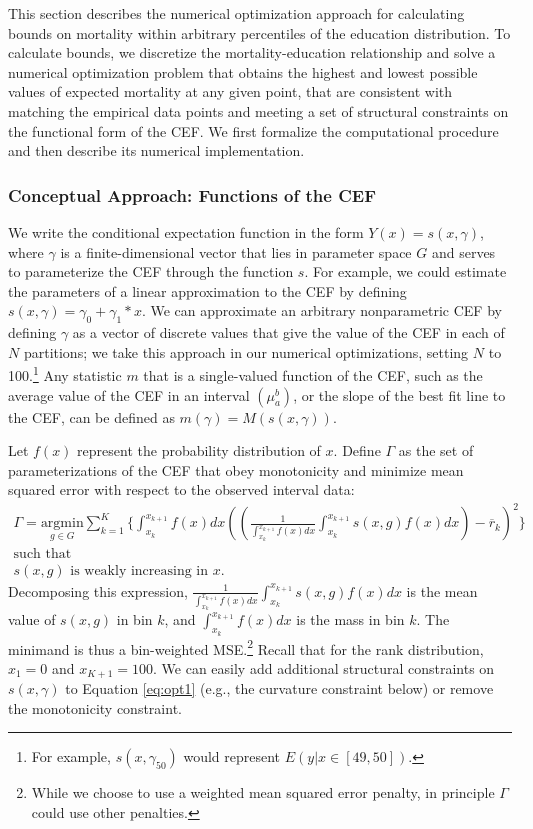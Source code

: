 This section describes the numerical optimization approach for
calculating bounds on mortality within arbitrary percentiles of the
education distribution. To calculate bounds, we discretize the mortality-education relationship and solve a numerical optimization problem that obtains the highest and lowest possible values of expected mortality at any given point, that are consistent with matching the empirical data points and meeting a set of structural constraints on the functional form of the CEF. We first formalize the computational procedure and then describe its numerical implementation.

\subsubsection{Conceptual Approach: Functions of the CEF} 
We write the conditional expectation function in the form
$Y(x) = s(x,\gamma)$, where $\gamma$ is a finite-dimensional vector
that lies in parameter space $G$ and serves to parameterize the CEF
through the function $s$. For example, we could estimate the
parameters of a linear approximation to the CEF by defining
$s(x,\gamma)=\gamma_0+\gamma_1*x$. We can approximate an arbitrary
nonparametric CEF by defining $\gamma$ as a vector of discrete values
that give the value of the CEF in each of $N$ partitions; we take this
approach in our numerical optimizations, setting $N$ to
100.\footnote{For example, $s(x,\gamma_{50})$ would represent $E(y|x
  \in [49,50])$.} Any statistic $m$ that is a single-valued function
of the CEF, such as the average value of the CEF in an interval
$(\mu_a^b)$, or the slope of the best fit line to the CEF, can be
defined as $m(\gamma)=M(s(x,\gamma))$.

Let $f(x)$ represent the probability distribution of $x$. Define $\Gamma$ as the set of parameterizations of the CEF that obey monotonicity and minimize mean squared error with respect to the observed interval data:
\begin{align}
  \label{eq:opt1}
  \Gamma = \underset{g \in G}{\text{argmin}} \sum_{k=1}^K \Bigg\{
  \int_{x_k}^{x_{k+1}} f(x) dx \left( \left(
  \frac{1}{\int_{x_k}^{x_{k+1}} f(x)dx } \int_{x_k}^{x_{k+1}} s(x,g)
  f(x) dx \right) - \overline{r}_k \right)^2 \Bigg\} \\ \nonumber
  \text{such that} \\ \tag{Monotonicity} s(x,g) \text{ is weakly
    increasing in } x.
\end{align}
\noindent Decomposing this expression, $\frac{1}{\int_{x_k}^{x_{k+1}}
  f(x)dx } \int_{x_k}^{x_{k+1}} s(x,g) f(x) dx$ is the mean value of
$s(x,g)$ in bin $k$, and $\int_{x_k}^{x_{k+1}} f(x) dx$ is the mass in
bin $k$. The minimand is thus a bin-weighted MSE.\footnote{While we
  choose to use a weighted mean squared error penalty, in principle
  $\Gamma$ could use other penalties.} Recall that for the rank
distribution, $x_1=0$ and $x_{K+1}=100$. We can easily add additional
structural constraints on $s(x,\gamma)$ to Equation \ref{eq:opt1} (e.g., the curvature
constraint below) or remove the monotonicity constraint. 

